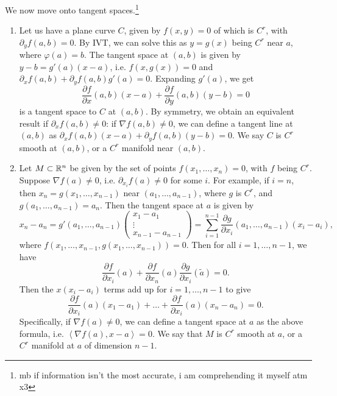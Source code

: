 \noindent We now move onto tangent spaces.\footnote{mb if information isn't the most accurate, i am comprehending it myself atm x3}
\begin{enumerate}[label=(\alph*)]
    \item Let us have a plane curve $C$, given by $f(x, y) = 0$ of which is $C^r$, with $\partial_y f (a, b) = 0$. By IVT, we can solve this as $y = g(x)$ being $C^r$ near $a$, where $\varphi(a) = b$. The tangent space at $(a, b)$ is given by $y - b = g'(a)(x - a)$, i.e. $f(x, g(x)) = 0$ and $\partial_x f(a, b) + \partial_y f(a, b) g'(a) = 0$. Expanding $g'(a)$, we get
    \[ \frac{\partial f}{\partial x}(a, b)(x - a) + \frac{\partial f}{\partial y}(a, b)(y - b) = 0 \]
    is a tangent space to $C$ at $(a, b)$. By symmetry, we obtain an equivalent result if $\partial_x f (a, b) \neq 0$: if $\nabla f(a, b) \neq 0$, we can define a tangent line at $(a, b)$ as $\partial_x f(a, b) (x - a) + \partial_y f(a, b) (y - b) = 0$. We say $C$ is $C^r$ smooth at $(a, b)$, or a $C^r$ manifold near $(a, b)$.

    \item Let $M \subset \mathbb R^n$ be given by the set of points $f(x_1, \dots, x_n) = 0$, with $f$ being $C^r$. Suppose $\nabla f(a) \neq 0$, i.e. $\partial_{x_i} f(a) \neq 0$ for some $i$. For example, if $i = n$, then $x_n = g(x_1, \dots, x_{n-1})$ near $(a_1, \dots, a_{n-1})$, where $g$ is $C^r$, and $g(a_1, \dots, a_{n-1}) = a_n$. Then the tangent space at $a$ is given by
    \[ x_n - a_n = g'(a_1, \dots, a_{n-1}) \begin{pmatrix} x_1 - a_1 \\ \vdots \\ x_{n-1} - a_{n-1} \end{pmatrix} = \sum_{i=1}^{n-1} \frac{\partial g}{\partial x_i}(a_1, \dots, a_{n-1}) (x_i - a_i), \]
    where $f(x_1, \dots, x_{n-1}, g(x_1, \dots, x_{n-1})) = 0$. Then for all $i = 1, \dots, n-1$, we have
    \[ \frac{\partial f}{\partial x_i}(a) + \frac{\partial f}{\partial x_n}(a) \frac{\partial g}{\partial x_i}(\tilde{a}) = 0. \]
    Then the $x(x_i - a_i)$ terms add up for $i = 1, \dots, n-1$ to give
    \[ \frac{\partial f}{\partial x_i}(a)(x_1 - a_1) + \dots + \frac{\partial f}{\partial x_i}(a)(x_n - a_n) = 0. \] 
    Specifically, if $\nabla f(a) \neq 0$, we can define a tangent space at $a$ as the above formula, i.e. $\left< \nabla f(a), x - a \right> = 0$. We say that $M$ is $C^r$ smooth at $a$, or a $C^r$ manifold at $a$ of dimension $n-1$.
\end{enumerate}
